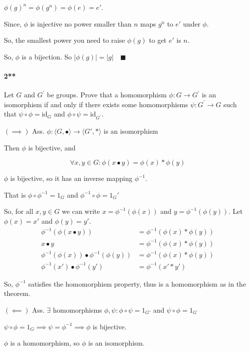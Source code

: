 \documentclass{article}
\begin{document}
$\phi(g)^n = \phi(g^n) = \phi(e) = e'$.

Since, $\phi$ is injective no power smaller than $n$ maps $g^n$ to
$e'$ under $\phi$.

So, the smallest power you need to raise $\phi(g)$ to get $e'$ is $n.$

So, $\phi$ is a bijection. So $|\phi(g)| = |g|\quad \blacksquare$


\paragraph{2**} Let $G$ and $G^\prime$ be groups. Prove that a
homomorphism $\phi: G\rightarrow G^\prime$ is an isomorphism if and
only if there exists some homomorphisms $\psi:G^\prime\rightarrow G$
such that $\psi\circ \phi = \text{id}_G$ and $\phi\circ \psi = \text{id}_{G^\prime}$.


$(\implies)$ Ass. $\phi:\langle
G,\bullet\rangle\rightarrow \langle G',* \rangle$ is an isomorphism

Then $\phi$ is bijective, and

$$\forall x,y \in G: \phi(x\bullet y) =\phi(x)*\phi(y)$$

$\phi$ is bijective, so it has an inverse mapping $\phi^{-1}$.

That is $\phi\circ \phi^{-1} = 1_G$ and $\phi^{-1}\circ \phi = 1_G'$

So, for all $x,y\in G$ we can write $x = \phi^{-1}(\phi(x))$ and $y =
\phi^{-1}(\phi(y))$. Let $\phi(x) = x'$ and  $\phi(y) = y'$.
\begin{align*}
  \phi^{-1}(\phi(x\bullet y)) &=\phi^{-1}(\phi(x)*\phi(y))\\
  x\bullet y &= \phi^{-1}(\phi(x)*\phi(y))\\
  \phi^{-1}(\phi(x))\bullet \phi^{-1}(\phi(y)) &=
                                                 \phi^{-1}(\phi(x)*\phi(y))\\
  \phi^{-1}(x')\bullet \phi^{-1}(y') &= \phi^{-1}(x'*y')
\end{align*}

So, $\phi^{-1}$ satisfies the homomorphism property, thus is a
homomorphism as in the theorem.

$(\impliedby)$ Ass. $\exists$ homomorphisms $\phi,\psi: \phi\circ\psi = 1_{G'}$ and
$\psi\circ\phi = 1_G$

$\psi\circ\phi = 1_G \implies \psi = \phi^{-1} \implies \phi$ is
bijective.

$\phi$ is a homomorphism, so $\phi$ is an isomorphism.
\end{document}
